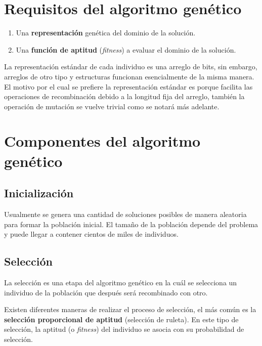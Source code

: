 \section{Requisitos del algoritmo gen\'etico}

\begin{enumerate}
  \item Una \textbf{representación} genética del dominio de la solución.
  \item Una \textbf{función de aptitud} (\textit{fitness}) a evaluar el dominio de la solución.
\end{enumerate}

\noindent La representación estándar de cada individuo es una arreglo de bits, sin embargo, arreglos de otro tipo y estructuras funcionan esencialmente de la misma manera. El motivo por el cual se prefiere la representación estándar es porque facilita las operaciones de recombinación debido a la longitud fija del arreglo, también la operación de mutación se vuelve trivial como se notará más adelante.


\section{Componentes del algoritmo gen\'etico}

\subsection{Inicializaci\'on}

Usualmente se genera una cantidad de soluciones posibles de manera aleatoria para formar la población inicial. El tamaño de la población depende del problema y puede llegar a contener cientos de miles de individuos.

\subsection{Selecci\'on}

La selección es una etapa del algoritmo genético en la cuál se selecciona un individuo de la población que después será recombinado con otro.\par

Existen diferentes maneras de realizar el proceso de selección, el más común es la \textbf{selección proporcional de aptitud} (selección de ruleta). En este tipo de selección, la aptitud (o \textit{fitness}) del individuo se asocia con su probabilidad de selección.\par

